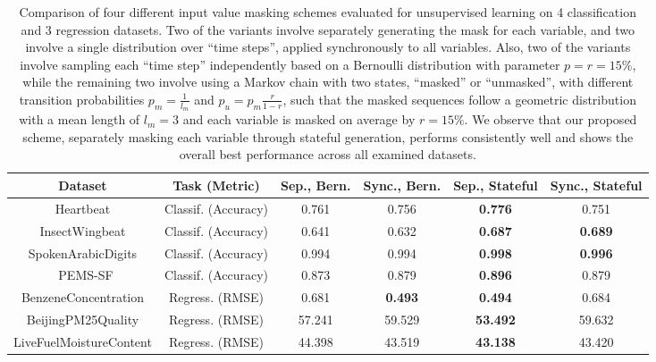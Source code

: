 \documentclass{article} \usepackage{iclr2021_conference,times}
\begin{document}
\begin{table}
\centering
\begin{adjustbox}{width=1.2\textwidth,center=\textwidth}

\begin{tabular}{|c|c|c|c|c|c|} 
\hline
\textbf{Dataset}        & \textbf{Task (Metric)} & \textbf{Sep., Bern.} & \textbf{\textbf{Sync., Bern.}}  & \textbf{Sep., Stateful} & \textbf{Sync., Stateful}  \\ 
\hline
Heartbeat               & Classif. (Accuracy)    & 0.761                & 0.756                           & \textbf{0.776}          & 0.751                     \\
InsectWingbeat          & Classif. (Accuracy)    & 0.641                & 0.632                           & \textbf{0.687}          & \textbf{0.689}            \\
SpokenArabicDigits      & Classif. (Accuracy)    & 0.994                & 0.994                           & \textbf{0.998}          & \textbf{0.996}            \\
~PEMS-SF                & Classif. (Accuracy)    & 0.873                  & 0.879                             & \textbf{0.896}                     & 0.879                       \\ 
\hhline{|======|}
BenzeneConcentration    & Regress. (RMSE)        & 0.681                & \textbf{0.493}                  & \textbf{0.494}          & 0.684                     \\
BeijingPM25Quality      & Regress. (RMSE)        & 57.241               & 59.529                          & \textbf{53.492}         & 59.632                    \\
LiveFuelMoistureContent & Regress. (RMSE)        & 44.398               & 43.519                          & \textbf{43.138}         & 43.420                    \\
\hline
\end{tabular}
\end{adjustbox}
\caption{Comparison of four different input value masking schemes evaluated for unsupervised learning on 4 classification and 3 regression datasets. Two of the variants involve separately generating the mask for each variable, and two involve a single distribution over ``time steps'', applied synchronously to all variables. Also, two of the variants involve sampling each ``time step'' independently based on a Bernoulli distribution with parameter $p=r=15\%$, while the remaining two involve using a Markov chain with two states, ``masked'' or ``unmasked'', with different transition probabilities $p_m = \frac{1}{l_m}$ and $p_u = p_m  \frac{r}{1 - r}$, such that the masked sequences follow a geometric distribution with a mean length of $l_m=3$ and each variable is masked on average by $r=15\%$. We observe that our proposed scheme, separately masking each variable through stateful generation, performs consistently well and shows the overall best performance across all examined datasets.}
\label{tab:masking_schemes}
\end{table}
\end{document}
